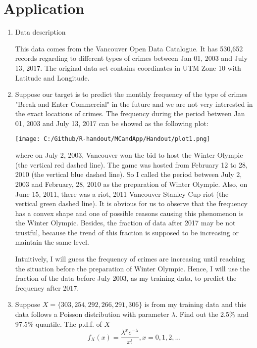 \documentclass[12pt]{article}
\begin{document}
\section{Application}
\begin{enumerate}
	\item Data description\cite{civ17}
	\par This data comes from the Vancouver Open Data Catalogue. It has 530,652 records regarding to different types of crimes between Jan 01, 2003 and July 13, 2017. The original data set contains coordinates in UTM Zone 10 with Latitude and Longitude. 
	\item Suppose our target is to predict the monthly frequency of the type of crimes "Break and Enter Commercial" in the future and we are not very interested in the exact locations of crimes. The frequency during the period between Jan 01, 2003 and July 13, 2017 can be showed as the following plot:
	\begin{center}
		\texttt{[image: C:/Github/R-handout/MCandApp/Handout/plot1.png]}
	\end{center}
	where on July 2, 2003, Vancouver won the bid to host the Winter Olympic (the vertical red dashed line). The game was hosted from February 12 to 28, 2010 (the vertical blue dashed line). So I called the period between July 2, 2003 and February, 28, 2010 as the preparation of Winter Olympic. Also, on June 15, 2011, there was a riot, 2011 Vancouver Stanley Cup riot (the vertical green dashed line). It is obvious for us to observe that the frequency has a convex shape and one of possible reasons causing this phenomenon is the Winter Olympic. Besides, the fraction of data after 2017 may be not trustful, because the trend of this fraction is supposed to be increasing or maintain the same level.
	\par Intuitively, I will guess the frequency of crimes are increasing until reaching the situation before the preparation of Winter Olympic. Hence, I will use the fraction of the data before July 2003, as my training data, to predict the frequency after 2017.
	\item
	\par Suppose $X = \{303, 254, 292, 266, 291, 306\}$ is from my training data and this data follows a Poisson distribution with parameter $\lambda$. Find out the 2.5\% and 97.5\% quantile. The p.d.f. of $X$
	\begin{equation*}
	f_X(x) = \frac{\lambda^{x}e^{-\lambda}}{x!} , x = 0, 1, 2, ...
	\end{equation*}

\end{enumerate}
\end{document}
